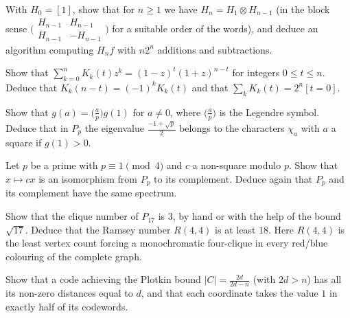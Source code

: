 \begin{exercise}[$\star\star$]\label{linear:ex:walsh}
With $H_0=[1]$, show that for $n\ge1$ we have $H_n=H_1\otimes H_{n-1}$ (in the block sense $\bigl(\begin{smallmatrix}H_{n-1}&H_{n-1}\\H_{n-1}&-H_{n-1}\end{smallmatrix}\bigr)$
for a suitable order of the words), and deduce an algorithm computing $H_nf$ with $n2^n$ additions and subtractions.
\end{exercise}

\begin{exercise}[$\star$]\label{linear:ex:krawgen}
Show that $\sum_{k=0}^nK_k(t)z^k=(1-z)^t(1+z)^{n-t}$ for integers $0\le t\le n$. Deduce that $K_k(n-t)=(-1)^kK_k(t)$ and that
$\sum_kK_k(t)=2^n[t=0]$.
\end{exercise}

\begin{exercise}[$\star\star$]\label{linear:ex:gausssign}
Show that $g(a)=\bigl(\frac ap\bigr)g(1)$ for $a\ne0$, where $\bigl(\frac ap\bigr)$ is the Legendre symbol. Deduce that in $P_p$ the
eigenvalue $\frac{-1+\sqrt p}2$ belongs to the characters $\chi_a$ with $a$ a square if $g(1)>0$.
\end{exercise}

\begin{exercise}[$\star$]\label{linear:ex:paleyself}
Let $p$ be a prime with $p\equiv1\pmod4$ and $c$ a non-square modulo $p$. Show that $x\mapsto cx$ is an isomorphism from $P_p$ to its complement.
Deduce again that $P_p$ and its complement have the same spectrum.
\end{exercise}

\begin{exercise}[$\star\star$]\label{linear:ex:paleyramsey}
Show that the clique number of $P_{17}$ is $3$, by hand or with the help of the bound $\sqrt{17}$. Deduce that the Ramsey number
$R(4,4)$ is at least $18$. Here $R(4,4)$ is the least vertex count forcing
a monochromatic four-clique in every red/blue colouring of the complete graph.
\end{exercise}

\begin{exercise}[$\star\star$]\label{linear:ex:plotkinsharp}
Show that a code achieving the Plotkin bound $|C|=\frac{2d}{2d-n}$ (with $2d>n$) has all its non-zero distances equal to $d$, and
that each coordinate takes the value $1$ in exactly half of its codewords.
\end{exercise}

